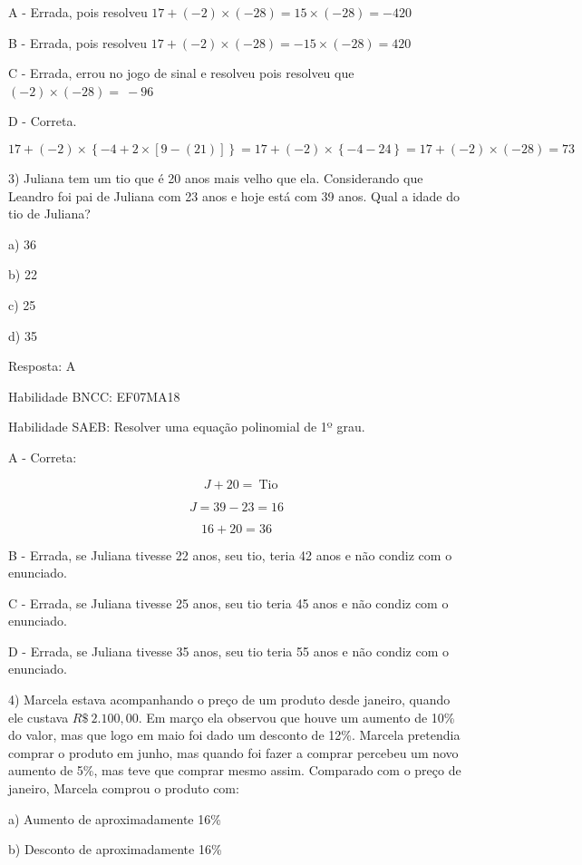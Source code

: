 {{{{{{{{{{{{{{A - Errada, pois resolveu
\(17 + ( - 2) \times \left( - 28 \right) = 15 \times ( - 28) = - 420\ \)

B - Errada, pois resolveu
\(17 + ( - 2) \times \left( - 28 \right) = - 15 \times ( - 28) = 420\ \)

C - Errada, errou no jogo de sinal e resolveu pois resolveu que
\(( - 2) \times \left( - 28 \right) = \  - 96\)

D - Correta.

\[17 + ( - 2) \times \left\{ - 4 + 2 \times \left\lbrack 9 - \left( 21 \right) \right\rbrack \right\} = 17 + ( - 2) \times \left\{ - 4 - 24 \right\} = 17 + ( - 2) \times \left( - 28 \right) = 73\]

3) Juliana tem um tio que é 20 anos mais velho que ela. Considerando que
Leandro foi pai de Juliana com 23 anos e hoje está com 39 anos. Qual a
idade do tio de Juliana?

a) 36

b) 22

c) 25

d) 35

Resposta: A

Habilidade BNCC: EF07MA18

Habilidade SAEB: Resolver uma equação polinomial de 1º grau.

A - Correta:

\[\text{\ \ \ \ \ \ \ }J + 20 = \ \text{Tio}\]

\[J = 39 - 23 = 16\]

\[16 + 20 = 36\]

B - Errada, se Juliana tivesse 22 anos, seu tio, teria 42 anos e não
condiz com o enunciado.

C - Errada, se Juliana tivesse 25 anos, seu tio teria 45 anos e não
condiz com o enunciado.

D - Errada, se Juliana tivesse 35 anos, seu tio teria 55 anos e não
condiz com o enunciado.

4) Marcela estava acompanhando o preço de um produto desde janeiro,
quando ele custava \(R\$\ 2.100,00\). Em março ela observou que houve um
aumento de 10\% do valor, mas que logo em maio foi dado um desconto de
12\%. Marcela pretendia comprar o produto em junho, mas quando foi fazer
a comprar percebeu um novo aumento de 5\%, mas teve que comprar mesmo
assim. Comparado com o preço de janeiro, Marcela comprou o produto com:

a) Aumento de aproximadamente 16\%

b) Desconto de aproximadamente 16\%

}}}}}}}}}}}}}}
